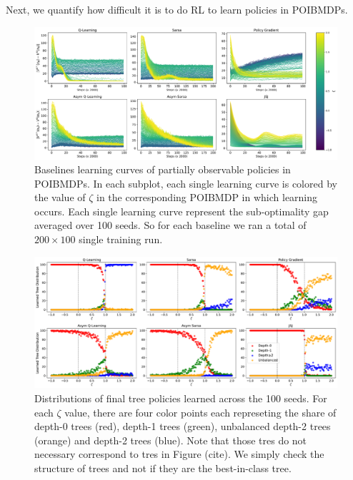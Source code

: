 Next, we quantify how difficult it is to do RL to learn policies in POIBMDPs.
\begin{figure}
    \centering
    \includegraphics[width=1\textwidth]{images/images_part1/learning_curves.pdf}
    \caption{Baselines learning curves of partially observable policies in POIBMDPs. 
    In each subplot, each single learning curve is colored by the value of $\zeta$ in the corresponding POIBMDP in which learning occurs. 
    Each single learning curve represent the sub-optimality gap averaged over 100 seeds.
    So for each baseline we ran a total of $200 \times 100$ single training run.
    }\label{fig:rl-poibmdp}
\end{figure}

\begin{figure}
    \centering
    \includegraphics[width=1\textwidth]{images/images_part1/tree_distributions.pdf}
    \caption{Distributions of final tree policies learned across the 100 seeds.
    For each $\zeta$ value, there are four color points each represeting the share of depth-0 trees (red), depth-1 trees (green), unbalanced depth-2 trees (orange) and depth-2 trees (blue).
    Note that those tres do not necessary correspond to tres in Figure (cite). We simply check the structure of trees and not if they are the best-in-class tree. 
    }\label{fig:dt-distrib-poibmdp}
\end{figure}


